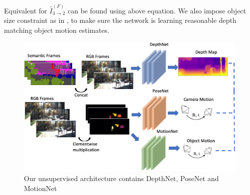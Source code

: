 \documentclass[10pt,twocolumn,letterpaper]{article}
\begin{document}
Equivalent for $\hat I_{3\rightarrow2}^{(F)}$ can be found using above equation. We also impose object size constraint as in \cite{casser2018depth}, to make sure the network is learning reasonable depth matching object motion estimates. 
\begin{figure}
    \centering
    \includegraphics[width=\linewidth]{architecture.png}
    \caption{Our unsupervised architecture contains DepthNet, PoseNet and MotionNet}
    \label{fig:arch}
\end{figure}
\end{document}
